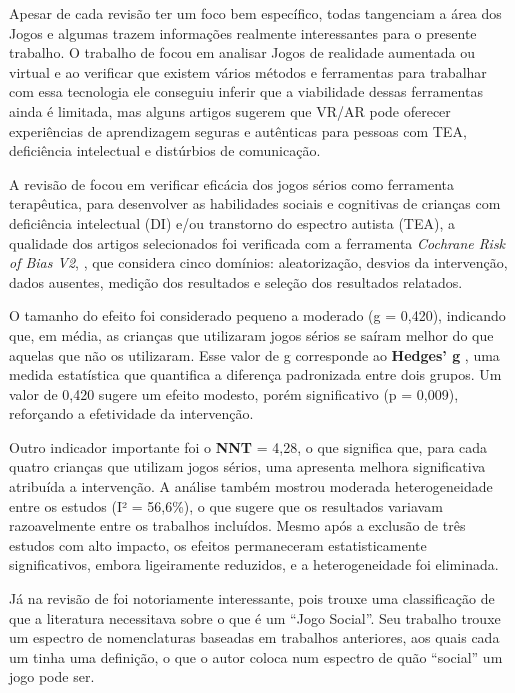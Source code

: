 Apesar de cada revisão ter um foco bem específico, todas tangenciam a área dos Jogos e algumas trazem informações realmente interessantes para o presente trabalho. O trabalho de  focou em analisar Jogos de realidade aumentada ou virtual e ao verificar que existem vários métodos e ferramentas para trabalhar com essa tecnologia ele conseguiu inferir que a viabilidade dessas ferramentas ainda é limitada, mas alguns artigos sugerem que VR/AR pode oferecer experiências de aprendizagem seguras e autênticas para pessoas com TEA, deficiência intelectual e distúrbios de comunicação.


A revisão de  focou em verificar eficácia dos jogos sérios como ferramenta terapêutica, para desenvolver as habilidades sociais e cognitivas de crianças com deficiência intelectual (DI) e/ou transtorno do espectro autista (TEA), a qualidade dos artigos selecionados foi verificada com a ferramenta \textit{Cochrane Risk of Bias V2}, \cite{higgins2008cochrane}, que considera cinco domínios: aleatorização, desvios da intervenção, dados ausentes, medição dos resultados e seleção dos resultados relatados.

O tamanho do efeito foi considerado pequeno a moderado (g = 0,420), indicando que, em média, as crianças que utilizaram jogos sérios se saíram melhor do que aquelas que não os utilizaram. Esse valor de g corresponde ao \textbf{Hedges' g} \cite{hedges1985statistical}, uma medida estatística que quantifica a diferença padronizada entre dois grupos. Um valor de 0,420 sugere um efeito modesto, porém significativo (p = 0,009), reforçando a efetividade da intervenção.

Outro indicador importante foi o \textbf{NNT}  = 4,28, o que significa que, para cada quatro crianças que utilizam jogos sérios, uma apresenta melhora significativa atribuída a intervenção. A análise também mostrou moderada heterogeneidade entre os estudos (I² = 56,6\%), o que sugere que os resultados variavam razoavelmente entre os trabalhos incluídos. Mesmo após a exclusão de três estudos com alto impacto, os efeitos permaneceram estatisticamente significativos, embora ligeiramente reduzidos, e a heterogeneidade foi eliminada.

Já na revisão de  foi notoriamente interessante, pois trouxe uma classificação de que a literatura necessitava sobre o que é um ``Jogo Social''. Seu trabalho trouxe um espectro de nomenclaturas baseadas em trabalhos anteriores, aos quais cada um tinha uma definição, o que o autor coloca num espectro de quão ``social'' um jogo pode ser.

